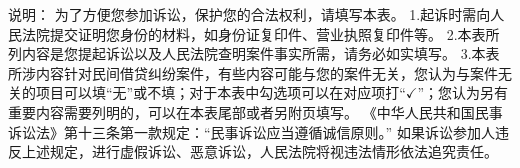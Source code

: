 \documentclass[zihao=-4]{ctexart}
\begin{document}

\begin{linote}
说明：\newline
\hspace*{2\ccwd}为了方便您参加诉讼，保护您的合法权利，请填写本表。\newline
\hspace*{2\ccwd}1.起诉时需向人民法院提交证明您身份的材料，如身份证复印件、营业执照复印件等。\newline
\hspace*{2\ccwd}2.本表所列内容是您提起诉讼以及人民法院查明案件事实所需，请务必如实填写。\newline
\hspace*{2\ccwd}3.本表所涉内容针对民间借贷纠纷案件，有些内容可能与您的案件无关，您认为与案件无关的项目可以填“无”或不填；对于本表中勾选项可以在对应项打“$\checkmark$”；您认为另有重要内容需要列明的，可以在本表尾部或者另附页填写。\newline
\hspace*{2\ccwd}{\bfseries ★特别提示★}\newline
\hspace*{2\ccwd}《中华人民共和国民事诉讼法》第十三条第一款规定：“民事诉讼应当遵循诚信原则。”\newline
\hspace*{2\ccwd}如果诉讼参加人违反上述规定，进行虚假诉讼、恶意诉讼，人民法院将视违法情形依法追究责任。
\end{linote}
\end{document}
